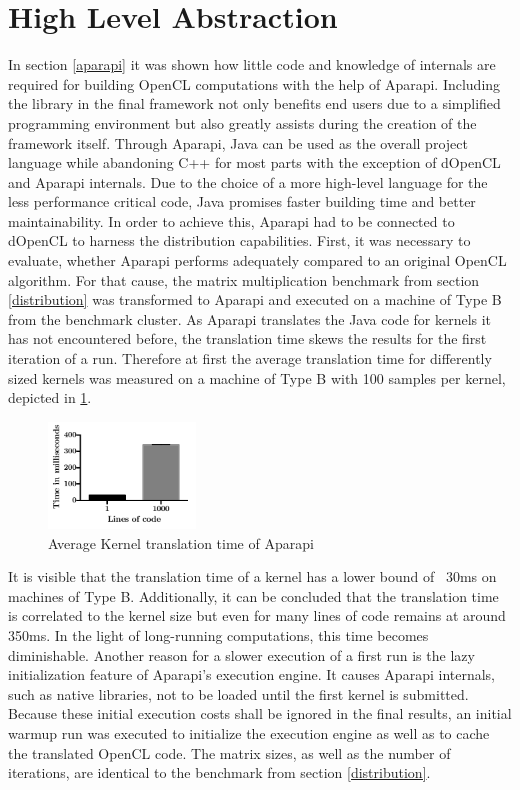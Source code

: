 \section{High Level Abstraction}
\label{abstraction}

In section \ref{aparapi} it was shown how little code and knowledge of internals are required for building OpenCL computations with the help of Aparapi. Including the library in the final framework not only benefits end users due to a simplified programming environment but also greatly assists during the creation of the framework itself. Through Aparapi, Java can be used as the overall project language while abandoning C++ for most parts with the exception of dOpenCL and Aparapi internals. Due to the choice of a more high-level language for the less performance critical code, Java promises faster building time and better maintainability. In order to achieve this, Aparapi had to be connected to dOpenCL to harness the distribution capabilities. First, it was necessary to evaluate, whether Aparapi performs adequately compared to an original OpenCL algorithm. For that cause, the matrix multiplication benchmark from section \ref{distribution} was transformed to Aparapi and executed on a machine of Type B from the benchmark cluster. As Aparapi translates the Java code for kernels it has not encountered before, the translation time skews the results for the first iteration of a run. Therefore at first the average translation time for differently sized kernels was measured on a machine of Type B with 100 samples per kernel, depicted in \ref{img:aparapi_translation}.

\begin{figure}[!htb]
	\includegraphics[width=0.35\textwidth]{images/aparapi_translation.pdf}
	\centering
	\caption{Average Kernel translation time of Aparapi}
	\label{img:aparapi_translation}
\end{figure}

It is visible that the translation time of a kernel has a lower bound of ~30ms on machines of Type B. Additionally, it can be concluded that the translation time is correlated to the kernel size but even for many lines of code remains at around 350ms. In the light of long-running computations, this time becomes diminishable. Another reason for a slower execution of a first run is the lazy initialization feature of Aparapi's execution engine. It causes Aparapi internals, such as native libraries, not to be loaded until the first kernel is submitted. Because these initial execution costs shall be ignored in the final results, an initial warmup run was executed to initialize the execution engine as well as to cache the translated OpenCL code. The matrix sizes, as well as the number of iterations, are identical to the benchmark from section \ref{distribution}.

